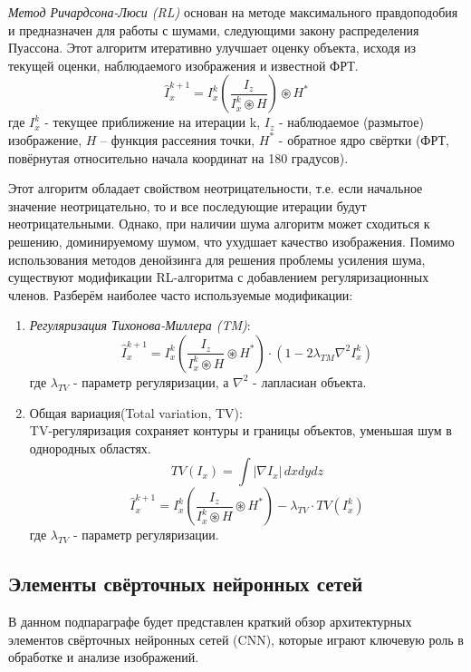 \par \textit{Метод Ричардсона-Люси (RL)} основан на методе максимального правдоподобия и предназначен для работы с шумами, следующими закону распределения Пуассона. Этот алгоритм итеративно улучшает оценку объекта, исходя из текущей оценки, наблюдаемого изображения и известной ФРТ.
\begin{equation}
	\hat I^{k+1}_x = I^{k}_x(\frac{I_z}{I^{k}_x\circledast H})\circledast H^*
\end{equation}
где $I^k_x$ - текущее приближение на итерации k, $I_z$ - наблюдаемое (размытое) изображение, $H$ – функция рассеяния точки, $H^*$ - обратное ядро свёртки (ФРТ, повёрнутая относительно начала координат на 180 градусов).
\par Этот алгоритм обладает свойством неотрицательности, т.е. если начальное значение неотрицательно, то и все последующие итерации будут неотрицательными. Однако, при наличии шума алгоритм может сходиться к решению, доминируемому шумом, что ухудшает качество изображения. Помимо использования методов денойзинга для решения проблемы усиления шума, существуют модификации RL-алгоритма с добавлением регуляризационных членов. Разберём наиболее часто используемые модификации:
\begin{enumerate}[]
	\item \textit{Регуляризация Тихонова-Миллера (TM)}:\\
	\begin{equation}
		\hat I^{k+1}_x = I^{k}_x(\frac{I_z}{I^{k}_x\circledast H}\circledast H^*)\cdot(1 - 2\lambda_{TM}\nabla^2 I^{k}_x)
	\end{equation}
	где $\lambda_{TV}$ - параметр регуляризации, а $\nabla^2$ - лапласиан объекта.
	\item Общая вариация(Total variation, TV):\\
	TV-регуляризация сохраняет контуры и границы объектов, уменьшая шум в однородных областях.
	\begin{equation}
		TV(I_x) = \int |\nabla I_x| \, dxdydz
	\end{equation}
	\begin{equation}
		\hat I^{k+1}_x = I^{k}_x(\frac{I_z}{I^{k}_x\circledast H}\circledast H^*) - \lambda_{TV}\cdot TV(I^{k}_x)
	\end{equation}
	где $\lambda_{TV}$ - параметр регуляризации.
\end{enumerate}

\subsection{Элементы свёрточных нейронных сетей}
\par В данном подпараграфе будет представлен краткий обзор архитектурных элементов свёрточных нейронных сетей (CNN), которые играют ключевую роль в обработке и анализе изображений. 

